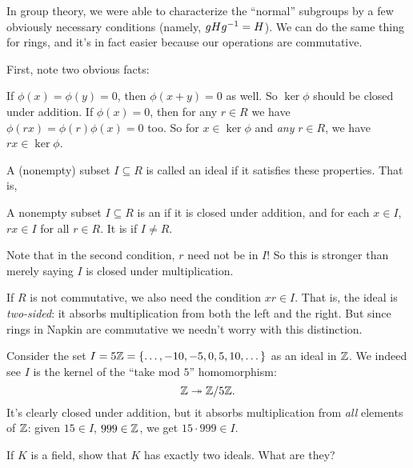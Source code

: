 In group theory, we were able to characterize the ``normal'' subgroups by a few
obviously necessary conditions (namely, $gHg^{-1} = H$).
We can do the same thing for rings, and it's in fact easier because our operations are commutative.

First, note two obvious facts:
\begin{itemize}
	\ii If $\phi(x) = \phi(y) = 0$, then $\phi(x+y) = 0$ as well.
	So $\ker \phi$ should be closed under addition.
	\ii If $\phi(x) = 0$, then for any $r \in R$ we have
	$\phi(rx) = \phi(r)\phi(x) = 0$ too.
	So for $x \in \ker \phi$ and \emph{any} $r \in R$,
	we have $rx \in \ker\phi$.
\end{itemize}

A (nonempty) subset $I \subseteq R$ is called
an ideal if it satisfies these properties.
That is,
\begin{definition}
	A nonempty subset $I \subseteq R$ is an 
	if it is closed under addition, and for each $x \in I$,
	$rx \in I$ for all $r \in R$.
	It is  if $I \neq R$.
\end{definition}

Note that in the second condition, $r$ need not be in $I$!
So this is stronger than merely saying $I$ is closed under multiplication.
\begin{remark}
	If $R$ is not commutative, we also need the condition $xr \in I$.
	That is, the ideal is \emph{two-sided}: it absorbs multiplication
	from both the left and the right.
	But since rings in Napkin are commutative
	we needn't worry with this distinction.
\end{remark}

\begin{example}
	Consider the set $I = 5\mathbb Z = \{\dots,-10,-5,0,5,10,\dots\}$ as an ideal in $\mathbb Z$.
	We indeed see $I$ is the kernel of the ``take mod $5$'' homomorphism:
	\[ \mathbb Z \twoheadrightarrow \mathbb Z/5\mathbb Z. \]
	It's clearly closed under addition,
	but it absorbs multiplication from \emph{all} elements of $\mathbb Z$:
	given $15 \in I$, $999 \in \mathbb Z$, we get $15 \cdot 999 \in I$.
\end{example}

\begin{exercise}
	If $K$ is a field, show that $K$ has exactly two ideals.
	What are they?
	\label{exer:field_ideal}
\end{exercise}


